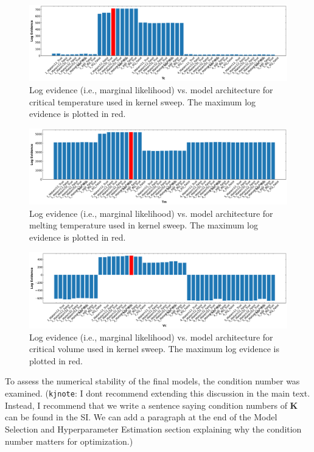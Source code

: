 \documentclass[journal=jacsat,manuscript=article]{achemso}
\newcommand{\kjnote}[1]{{\color{Blue} (\texttt{kjnote}: #1)}}
\begin{document}
\begin{figure}
    \centering
    \includegraphics[width=\linewidth]{images/lml_bar_chart_Tc.png}
    \caption{Log evidence (i.e., marginal likelihood) vs. model architecture for critical temperature used in kernel sweep. The maximum log evidence is plotted in red.}
\end{figure}
\begin{figure}
    \centering
    \includegraphics[width=\linewidth]{images/lml_bar_chart_Tm.png}
    \caption{Log evidence (i.e., marginal likelihood) vs. model architecture for melting temperature used in kernel sweep. The maximum log evidence is plotted in red.}
\end{figure}
\begin{figure}
    \centering
    \includegraphics[width=\linewidth]{images/lml_bar_chart_Vc.png}
    \caption{Log evidence (i.e., marginal likelihood) vs. model architecture for critical volume used in kernel sweep. The maximum log evidence is plotted in red.}
\end{figure}
To assess the numerical stability of the final models, the condition number was examined. \kjnote{I dont recommend extending this discussion in the main text. Instead, I recommend that we write a sentence saying condition numbers of $\mathbf{K}$ can be found in the SI. We can add a paragraph at the end of the Model Selection and Hyperparameter Estimation section explaining why the condition number matters for optimization.}
\FloatBarrier
\end{document}
